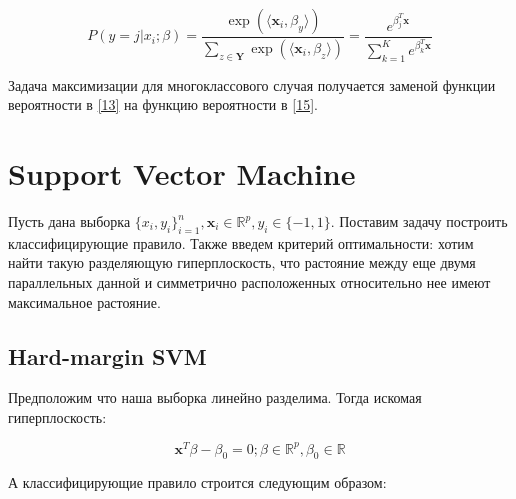 \documentclass[11pt, oneside]{article}   	%
\begin{document}
\begin{equation}
	P(y = j | x_i; \beta) = \dfrac{\exp(\langle \bm{x}_i, \beta_y \rangle)}{\sum\limits_{z \in \bm{Y}} \exp(\langle \bm{x}_i, \beta_z \rangle)} = \dfrac{e^{\beta_j^T\bm{x}}}{\sum\limits_{k = 1}^K e^{\beta_k^T\bm{x}}}
	\label{15}
\end{equation}

Задача максимизации для многоклассового случая получается заменой функции вероятности в \ref{13} на функцию вероятности в \ref{15}.

\section{Support Vector Machine}

Пусть дана выборка $\{x_i, y_i\}_{i=1}^{n}, \bm{x}_i \in \mathbb{R}^{p}, y_i \in \{-1, 1\}$. Поставим задачу построить классифицирующие правило. Также введем критерий оптимальности: хотим найти такую разделяющую гиперплоскость, что растояние между еще двумя параллельных данной и симметрично расположенных относительно нее имеют максимальное растояние.
 
\begin{figure}[h]
\end{figure}

\subsection{Hard-margin SVM}

Предположим что наша выборка линейно разделима. Тогда искомая гиперплоскость:

\begin{equation}
	\bm{x}^T\beta - \beta_0 = 0; \beta \in  \mathbb{R}^{p}, \beta_0 \in \mathbb{R}
	\label{16}
\end{equation}

А классифицирующие правило строится следующим образом:
\end{document}
